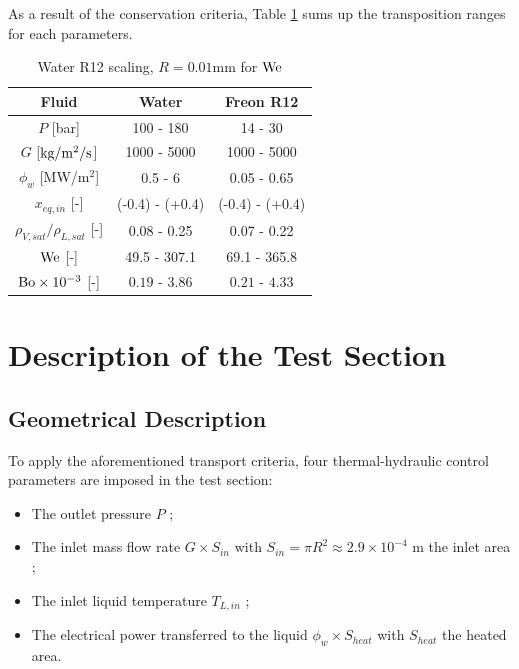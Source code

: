 As a result of the conservation criteria, Table \ref{tab:R12_PWR_transposition} sums up the transposition ranges for each parameters.



\begin{table}[!h]
\centering
\begin{tabular}{c||c|c} 

Fluid & Water & Freon R12 \\
\hline \hline
$P$ [bar] & 100 - 180 & 14 - 30\\
%
$G$ [$\text{kg/m$^{2}$/s}$] & 1000 - 5000 & 1000 - 5000\\
%
$\phi_{w}$ [MW/m$^{2}$] & 0.5 - 6 & 0.05 - 0.65\\ 
%
$x_{eq,in}$ [-] & (-0.4) - (+0.4) & (-0.4) - (+0.4)\\
\hline
\hline 
${\rho_{V,sat}}/{\rho_{L,sat}}$ [-] & 0.08 - 0.25 & 0.07 - 0.22\\
%
$\mathrm{We}$ [-] & 49.5 - 307.1 & 69.1 - 365.8\\
%
$\mathrm{Bo} \times 10^{-3} $ [-] &  $0.19$ - $3.86$ & $0.21$ - $4.33$ \\
\hline
\end{tabular}

\caption{Water R12 scaling, $R=0.01$mm for $\mathrm{We}$}
\label{tab:R12_PWR_transposition}

\end{table}



\section{Description of the Test Section}

\subsection{Geometrical Description}
To apply the aforementioned transport criteria, four thermal-hydraulic control parameters are imposed in the test section:

\begin{itemize}
\item The outlet pressure $P$ ;
\item The inlet mass flow rate $G \times S_{in}$ with $S_{in} = \pi R^{2} \approx 2.9 \times 10^{-4}$ m the inlet area ;
\item The inlet liquid temperature $T_{L,in}$ ;
\item The electrical power transferred to the liquid $\phi_{w}\times S_{heat}$ with $S_{heat}$ the heated area. 
\end{itemize}

